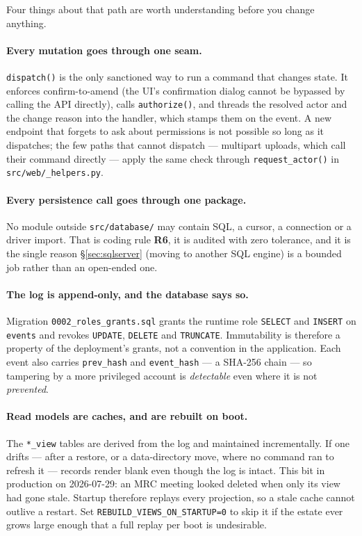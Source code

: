 \documentclass[11pt]{article}
\newcommand{\cfg}[1]{\texttt{#1}}
\newcommand{\rulename}[1]{\textbf{#1}}
\begin{document}
Four things about that path are worth understanding before you change anything.

\paragraph{Every mutation goes through one seam.} \texttt{dispatch()} is the only sanctioned
way to run a command that changes state. It enforces confirm-to-amend (the UI's
confirmation dialog cannot be bypassed by calling the API directly), calls
\texttt{authorize()}, and threads the resolved actor and the change reason into the
handler, which stamps them on the event. A new endpoint that forgets to ask about
permissions is not possible so long as it dispatches; the few paths that cannot dispatch
--- multipart uploads, which call their command directly --- apply the same check through
\texttt{request\_actor()} in \texttt{src/web/\_helpers.py}.

\paragraph{Every persistence call goes through one package.} No module outside
\texttt{src/database/} may contain SQL, a cursor, a connection or a driver import. That is
coding rule \rulename{R6}, it is audited with zero tolerance, and it is the single reason
\S\ref{sec:sqlserver} (moving to another SQL engine) is a bounded job rather than an
open-ended one.

\paragraph{The log is append-only, and the database says so.} Migration
\texttt{0002\_roles\_grants.sql} grants the runtime role \texttt{SELECT} and
\texttt{INSERT} on \texttt{events} and revokes \texttt{UPDATE}, \texttt{DELETE} and
\texttt{TRUNCATE}. Immutability is therefore a property of the deployment's grants, not a
convention in the application. Each event also carries \texttt{prev\_hash} and
\texttt{event\_hash} --- a SHA-256 chain --- so tampering by a more privileged account is
\emph{detectable} even where it is not \emph{prevented}.

\paragraph{Read models are caches, and are rebuilt on boot.} The \texttt{*\_view} tables
are derived from the log and maintained incrementally. If one drifts --- after a restore,
or a data-directory move, where no command ran to refresh it --- records render blank even
though the log is intact. This bit in production on 2026-07-29: an MRC meeting looked
deleted when only its view had gone stale. Startup therefore replays every projection, so
a stale cache cannot outlive a restart. Set
\cfg{REBUILD\_VIEWS\_ON\_STARTUP=0} to skip it if the estate ever grows large enough that a
full replay per boot is undesirable.
\end{document}
